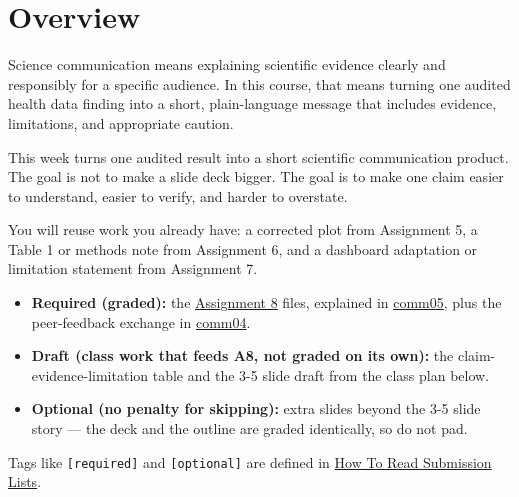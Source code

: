 \documentclass[
  letterpaper,
  DIV=11,
  numbers=noendperiod,
  oneside]{scrreprt}
\providecommand{\tightlist}{%
  \setlength{\itemsep}{0pt}\setlength{\parskip}{0pt}}
\begin{document}
\section*{Overview}\label{overview-8}


Science communication means explaining scientific evidence clearly and
responsibly for a specific audience. In this course, that means turning
one audited health data finding into a short, plain-language message
that includes evidence, limitations, and appropriate caution.

This week turns one audited result into a short scientific communication
product. The goal is not to make a slide deck bigger. The goal is to
make one claim easier to understand, easier to verify, and harder to
overstate.

You will reuse work you already have: a corrected plot from Assignment
5, a Table 1 or methods note from Assignment 6, and a dashboard
adaptation or limitation statement from Assignment 7.

\begin{tcolorbox}[enhanced jigsaw, title=\textcolor{quarto-callout-important-color}{\faExclamation}\hspace{0.5em}{Required / Draft / Optional This Week}, arc=.35mm, toptitle=1mm, colframe=quarto-callout-important-color-frame, toprule=.15mm, leftrule=.75mm, bottomtitle=1mm, opacityback=0, bottomrule=.15mm, coltitle=black, breakable, opacitybacktitle=0.6, titlerule=0mm, colback=white, left=2mm, colbacktitle=quarto-callout-important-color!10!white, rightrule=.15mm]

\begin{itemize}
\tightlist
\item
  \textbf{Required (graded):} the
  \href{../../assignments/assignment08-communication/README.md}{Assignment
  8} files, explained in
  \href{comm05-assignment-a8-and-reference.qmd}{comm05}, plus the
  peer-feedback exchange in \href{comm04-peer-feedback.qmd}{comm04}.
\item
  \textbf{Draft (class work that feeds A8, not graded on its own):} the
  claim-evidence-limitation table and the 3-5 slide draft from the class
  plan below.
\item
  \textbf{Optional (no penalty for skipping):} extra slides beyond the
  3-5 slide story --- the deck and the outline are graded identically,
  so do not pad.
\end{itemize}

Tags like \texttt{{[}required{]}} and \texttt{{[}optional{]}} are
defined in \hyperref[how-to-read-submission-lists]{How To Read
Submission Lists}.

\end{tcolorbox}
\end{document}
